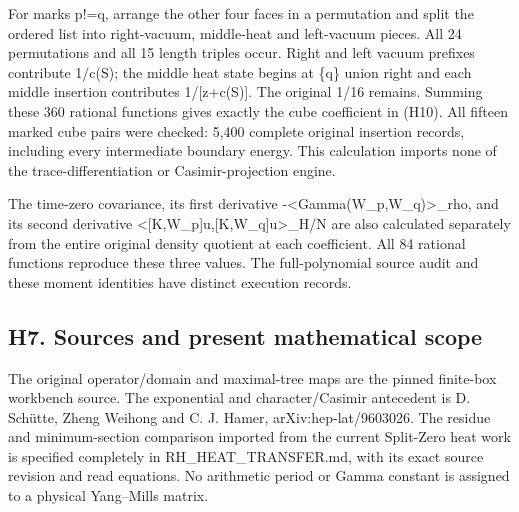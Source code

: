 \documentclass[11pt,a4paper]{article}
\newcounter{none}
\renewcommand{\[}{\begingroup\small\originaldisplaystart}
\renewcommand{\]}{\originaldisplayend\endgroup}
\begin{document}
For marks p!=q, arrange the other four faces in a permutation and split
the ordered list into right-vacuum, middle-heat and left-vacuum pieces.
All 24 permutations and all 15 length triples occur. Right and left
vacuum prefixes contribute 1/c(S); the middle heat state begins at \{q\}
union right and each middle insertion contributes 1/{[}z+c(S){]}. The
original 1/16 remains. Summing these 360 rational functions gives
exactly the cube coefficient in (H10). All fifteen marked cube pairs
were checked: 5,400 complete original insertion records, including every
intermediate boundary energy. This calculation imports none of the
trace-differentiation or Casimir-projection engine.

The time-zero covariance, its first derivative
{-\allowbreak{}\textless{}\allowbreak{}G\allowbreak{}a\allowbreak{}m\allowbreak{}m\allowbreak{}a\allowbreak{}(\allowbreak{}W\allowbreak{}\_\allowbreak{}p\allowbreak{},\allowbreak{}W\allowbreak{}\_\allowbreak{}q\allowbreak{})\allowbreak{}\textgreater{}\allowbreak{}\_\allowbreak{}r\allowbreak{}h\allowbreak{}o\allowbreak{},\allowbreak{}}
and its second derivative
{\textless{}\allowbreak{}[\allowbreak{}K\allowbreak{},\allowbreak{}W\allowbreak{}\_\allowbreak{}p\allowbreak{}]\allowbreak{}u\allowbreak{},\allowbreak{}[\allowbreak{}K\allowbreak{},\allowbreak{}W\allowbreak{}\_\allowbreak{}q\allowbreak{}]\allowbreak{}u\allowbreak{}\textgreater{}\allowbreak{}\_\allowbreak{}H\allowbreak{}/\allowbreak{}N\allowbreak{}}
are also calculated separately from the entire original density quotient
at each coefficient. All 84 rational functions reproduce these three
values. The full-polynomial source audit and these moment identities
have distinct execution records.

\subsection{H7. Sources and present mathematical
scope}\label{h7.-sources-and-present-mathematical-scope}

The original operator/domain and maximal-tree maps are the pinned
finite-box workbench source. The exponential and character/Casimir
antecedent is D. Schütte, Zheng Weihong and C. J. Hamer,
{a\allowbreak{}r\allowbreak{}X\allowbreak{}i\allowbreak{}v\allowbreak{}:\allowbreak{}h\allowbreak{}e\allowbreak{}p\allowbreak{}-\allowbreak{}l\allowbreak{}a\allowbreak{}t\allowbreak{}/\allowbreak{}9\allowbreak{}6\allowbreak{}0\allowbreak{}3\allowbreak{}0\allowbreak{}2\allowbreak{}6\allowbreak{}.\allowbreak{}}
The residue and minimum-section comparison imported from the current
Split-Zero heat work is specified completely in
{R\allowbreak{}H\allowbreak{}\_\allowbreak{}H\allowbreak{}E\allowbreak{}A\allowbreak{}T\allowbreak{}\_\allowbreak{}T\allowbreak{}R\allowbreak{}A\allowbreak{}N\allowbreak{}S\allowbreak{}F\allowbreak{}E\allowbreak{}R\allowbreak{}.\allowbreak{}m\allowbreak{}d\allowbreak{},\allowbreak{}}
with its exact source revision and read equations. No arithmetic period
or Gamma constant is assigned to a physical Yang--Mills matrix.
\end{document}
